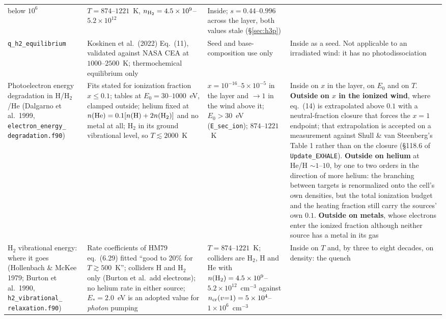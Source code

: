 \documentclass[english,a4paper]{my_memo}
\begin{document}
\begin{longtable}{@{}>{\raggedright\arraybackslash}p{}>{\raggedright\arraybackslash}p{}>{\raggedright\arraybackslash}p{}>{\raggedright\arraybackslash}p{}@{}}
    below $10^{6}$
  & $T = 874$--$1221$~K, $n_{\rm H_2} = 4.5\times10^{9}$--$5.2\times10^{12}$
  & Inside; $s = 0.44$--$0.996$ across the layer, both values stale
    (\S\ref{sec:h3p}) \\
\addlinespace
\texttt{q\_h2\_equilibrium}
  & Koskinen et al.\ (2022) Eq.~(11), validated against NASA CEA at
    $1000$--$2500$~K; thermochemical equilibrium only
  & Seed and base-composition use only
  & Inside as a seed. Not applicable to an irradiated wind: it has no
    photodissociation \\
\addlinespace
Photoelectron energy
  degradation in H/H$_2$/He
  (Dalgarno et al.\ 1999,
  \texttt{electron\_energy\_}
  \texttt{degradation.f90})
  & Fits stated for ionization fraction $x \leq 0.1$; tables at
    $E_0 = 30$--$1000$~eV, clamped outside; helium fixed at
    $n({\rm He}) = 0.1[n({\rm H}) + 2n({\rm H_2})]$ and no metal at all;
    H$_2$ in its ground vibrational level, so $T \lesssim 2000$~K
  & $x = 10^{-16}$--$5\times10^{-5}$ in the layer and $\to 1$ in the wind
    above it; $E_0 > 30$~eV (\texttt{E\_sec\_ion}); $874$--$1221$~K
  & Inside on $x$ in the layer, on $E_0$ and on $T$. \textbf{Outside on $x$
    in the ionized wind}, where eq.~(14) is extrapolated above $0.1$ with a
    neutral-fraction closure that forces the $x=1$ endpoint; that
    extrapolation is accepted on a measurement against Shull \& van
    Steenberg's Table 1 rather than on the closure (\S118.6 of
    \texttt{Update\_EXHALE}). \textbf{Outside on helium} at
    He/H $\sim 1$--$10$, by one to two orders in the direction of more
    helium: the branching between targets is renormalized onto the cell's
    own densities, but the total ionization budget and the heating fraction
    still carry the sources' own $0.1$. \textbf{Outside on metals}, whose
    electrons enter the ionized fraction although neither source has a metal
    in its gas \\
\addlinespace
H$_2$ vibrational energy:
  where it goes
  (Hollenbach \& McKee 1979;
  Burton et al.\ 1990,
  \texttt{h2\_vibrational\_}
  \texttt{relaxation.f90})
  & Rate coefficients of HM79 eq.~(6.29) fitted ``good to 20\% for
    $T \gtrsim 500$~K''; colliders H and H$_2$ only (Burton et al.\ add
    electrons); no helium rate in either source; $E_* = 2.0$~eV is an
    adopted value for \emph{photon} pumping
  & $T = 874$--$1221$~K; colliders are H$_2$, H and He with
    $n({\rm H_2}) = 4.5\times10^{9}$--$5.2\times10^{12}$~cm$^{-3}$ against
    $n_{\rm cr}(v{=}1) = 5\times10^{4}$--$1\times10^{6}$~cm$^{-3}$
  & Inside on $T$ and, by three to eight decades, on density: the quench

\end{longtable}
\end{document}
